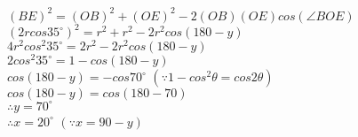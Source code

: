\documentclass[journal,12pt,twocolumn]{IEEEtran}
\renewcommand\thesection{\arabic{section}}
\begin{document}
\begin{enumerate}[label=\thesection.\arabic*.,ref=\thesection.\theenumi]
               $(BE)^2=(OB)^2+(OE)^2-2(OB)(OE)cos(\angle BOE)$\\ 
                $(2rcos 35^\circ)^2 = r^2+r^2 - 2r^2cos(180-y)$\\ 
                $4r^2cos^2 35^\circ=2r^2 - 2r^2cos(180-y)$\\ 
                $2cos^2 35^\circ=1-cos(180-y)$\\ 
                $cos(180-y)=-cos 70^\circ$       $(\because 1-cos^2\theta=cos 2\theta)$\\ 
               $cos(180-y)=cos(180-70)$\\ 
                $\therefore y=70^\circ$\\ 
               $\therefore x=20^\circ$             $(\because x=90-y)$\\  
               
               
\end{enumerate}
\end{document}
